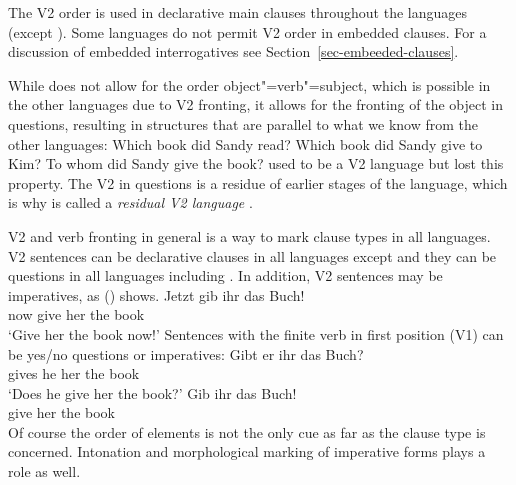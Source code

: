 The V2 order is used in declarative main clauses throughout the  languages (except
). Some  languages do not permit V2 order in embedded clauses. For a discussion of
embedded interrogatives see Section~\ref{sec-embeeded-clauses}.

While  does not allow for the order object"=verb"=subject, which is possible in the other 
languages due to V2 fronting, it allows for the fronting of the object in questions, resulting in
structures that are parallel to what we know from the other  languages:
\eal
\ex\label{ex-which-book-did-sandy-read}
Which book did Sandy read?
\ex\label{ex-which-book-did-sandy-give-to-kim}
Which book did Sandy give to Kim?
\ex To whom did Sandy give the book?
\zl
{} used to be a V2 language but lost this property. The V2 in questions is a residue of earlier
stages of the language, which is why  is called a \emph{residual V2 language} \citep[]{Rizzi1990a-u}. 

V2 and verb fronting in general is a way to mark clause types in all  languages. V2 sentences
can be declarative clauses in all  languages except  and they can be questions in all
 languages including . In addition, V2 sentences may be imperatives, as () shows.
\ea
\gll Jetzt gib ihr das Buch!\\
     now give her the book\\\german
\glt `Give her the book now!'
\z
Sentences with the finite verb in first position (V1) can be yes/no questions or imperatives:
\eal
\ex
\gll Gibt er ihr das Buch?\\
     gives he her the book\\\german
\glt `Does he give her the book?'
\ex 
\gll Gib ihr das Buch!\\
     give her the book\\
\zl
Of course the order of elements is not the only cue as far as the clause type is
concerned. Intonation and morphological marking of imperative forms plays a role as well.

